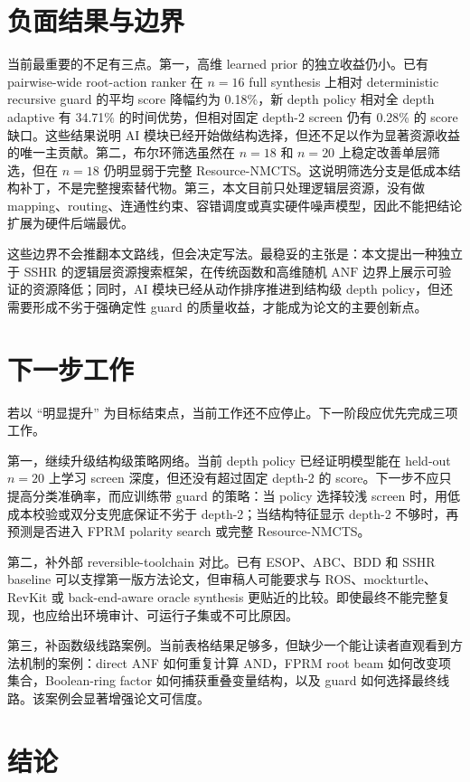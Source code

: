 \documentclass[UTF8,fontset=macnew,11pt]{ctexart}
\newcommand{\method}{Resource-NMCTS}
\newcommand{\anf}{\ensuremath{\mathrm{ANF}}}
\begin{document}
\section{负面结果与边界}

当前最重要的不足有三点。第一，高维 learned prior 的独立收益仍小。已有 pairwise-wide root-action ranker 在 $n=16$ full synthesis 上相对 deterministic recursive guard 的平均 score 降幅约为 0.18\%，新 depth policy 相对全 depth adaptive 有 34.71\% 的时间优势，但相对固定 depth-2 screen 仍有 0.28\% 的 score 缺口。这些结果说明 AI 模块已经开始做结构选择，但还不足以作为显著资源收益的唯一主贡献。第二，布尔环筛选虽然在 $n=18$ 和 $n=20$ 上稳定改善单层筛选，但在 $n=18$ 仍明显弱于完整 \method{}。这说明筛选分支是低成本结构补丁，不是完整搜索替代物。第三，本文目前只处理逻辑层资源，没有做 mapping、routing、连通性约束、容错调度或真实硬件噪声模型，因此不能把结论扩展为硬件后端最优。

这些边界不会推翻本文路线，但会决定写法。最稳妥的主张是：本文提出一种独立于 SSHR 的逻辑层资源搜索框架，在传统函数和高维随机 \anf{} 边界上展示可验证的资源降低；同时，AI 模块已经从动作排序推进到结构级 depth policy，但还需要形成不劣于强确定性 guard 的质量收益，才能成为论文的主要创新点。

\section{下一步工作}

若以 ``明显提升'' 为目标结束点，当前工作还不应停止。下一阶段应优先完成三项工作。

第一，继续升级结构级策略网络。当前 depth policy 已经证明模型能在 held-out $n=20$ 上学习 screen 深度，但还没有超过固定 depth-2 的 score。下一步不应只提高分类准确率，而应训练带 guard 的策略：当 policy 选择较浅 screen 时，用低成本校验或双分支兜底保证不劣于 depth-2；当结构特征显示 depth-2 不够时，再预测是否进入 FPRM polarity search 或完整 \method{}。

第二，补外部 reversible-toolchain 对比。已有 ESOP、ABC、BDD 和 SSHR baseline 可以支撑第一版方法论文，但审稿人可能要求与 ROS、mockturtle、RevKit 或 back-end-aware oracle synthesis 更贴近的比较。即使最终不能完整复现，也应给出环境审计、可运行子集或不可比原因。

第三，补函数级线路案例。当前表格结果足够多，但缺少一个能让读者直观看到方法机制的案例：direct ANF 如何重复计算 AND，FPRM root beam 如何改变项集合，Boolean-ring factor 如何捕获重叠变量结构，以及 guard 如何选择最终线路。该案例会显著增强论文可信度。

\section{结论}
\end{document}
